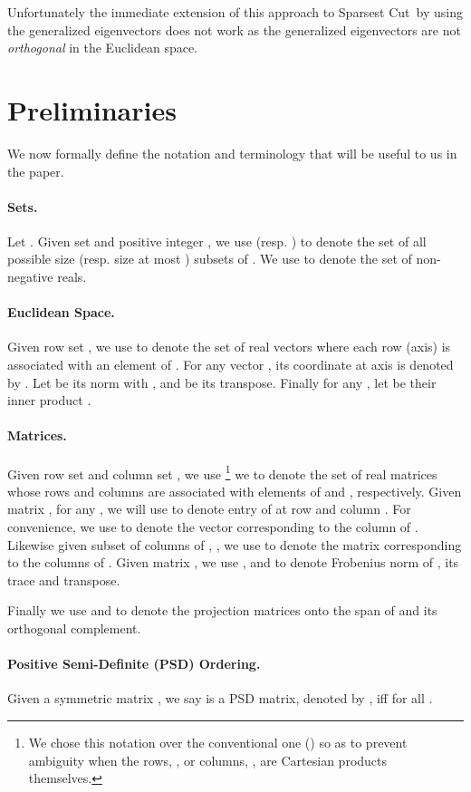 \documentclass{article}
\newcommand{\nusc}{\textsc{\sf Non-Uniform Sparsest Cut}}
\def\ngap{}
\renewcommand{\nusc}{{\sc Sparsest Cut}}
\begin{document}
Unfortunately the immediate extension of this approach to \nusc\ by
using the generalized eigenvectors does not work as the generalized
eigenvectors are not {\em orthogonal} in the Euclidean space.
\ngap
\section{Preliminaries}
\label{sec:prelim}
We now formally define the notation and terminology that will be
useful to us in the paper.

\paragraph{Sets.} Let . Given set  and positive integer , we use
 (resp. ) to denote the set of all
possible size  (resp. size at most ) subsets of .  We use
 to denote the set of non-negative reals.

\paragraph{Euclidean Space.} Given row set , we use  to
denote the set of real vectors where each row (axis) is associated
with an element of .
For any vector , its coordinate at axis  is
denoted by .  Let  be its  norm with
, and  be its transpose.
Finally for any , let  be their inner product .
 
\paragraph{Matrices.} Given row set  and column set , we use  \footnote{We chose
  this notation over the conventional one () so as to
  prevent ambiguity when the rows, , or columns, , are Cartesian
  products themselves.}  we to denote the set of real matrices whose
rows and columns are associated with elements of  and ,
respectively.  Given matrix , for any , we will use  to denote entry of  at
row  and column . For convenience, we use  to
denote the vector corresponding to the column  of . Likewise
given subset of columns of , , we use  to denote the matrix corresponding to the columns  of
.  Given matrix , we use ,  and
 to denote Frobenius norm of , its trace and transpose.

Finally we use  and  to denote the
projection matrices onto the span of  and its orthogonal
complement.

\paragraph{Positive Semi-Definite (PSD) Ordering.} Given a symmetric
matrix , we say  is a PSD matrix, denoted
by , iff  for all .
\end{document}
